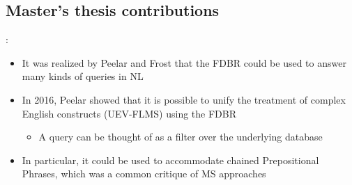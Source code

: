 \documentclass[logoontitle,tabu,supertabular,aspectratio=43]{preney-uwindsor-beamer}
\begin{document}
    \subsection{Master's thesis contributions}
    \begin{frame}{\insertsection: \insertsubsection}
        \begin{itemize}
            \item It was realized by Peelar and Frost that the FDBR could be used to answer many kinds of queries in NL
            \item In 2016, Peelar showed that it is possible to unify the treatment of complex English constructs (UEV-FLMS) using the FDBR \cite{peelar2016accommodating}
            \begin{itemize}
                \item A query can be thought of as a filter over the underlying database
            \end{itemize}
            \item In particular, it could be used to accommodate chained Prepositional Phrases, which was a common critique of MS approaches
        \end{itemize}
    \end{frame}

\end{document}
